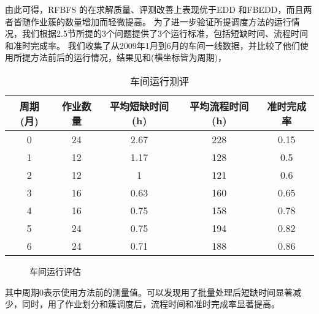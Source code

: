 由此可得，RFBFS 的在求解质量、评测改善上表现优于EDD 和FBEDD，而且两者皆随作业簇的数量增加而轻微提高。
为了进一步验证所提调度方法的运行情况，我们根据2.5节所提的3个问题提供了3个运行标准，包括短缺时间、流程时间和准时完成率。
我们收集了从2009年1月到6月的车间一线数据，并比较了他们使用所提方法前后的运行情况，结果见和(横坐标皆为周期)，
\begin{table}[h]
  \centering\xiaowu
  \caption{车间运行测评\label{tab:performancemeasure}}
    \begin{tabular}{ccccc}
    \toprule
    周期 (月) & 作业数量  & 平均短缺时间 (h) & 平均流程时间 (h) & 准时完成率 \\
    \midrule
    0     & 24    & 2.67  & 228   & 0.15 \\
    1     & 12    & 1.17  & 128   & 0.5 \\
    2     & 12    & 1     & 121   & 0.6 \\
    3     & 16    & 0.63  & 160   & 0.65 \\
    4     & 16    & 0.75  & 158   & 0.78 \\
    5     & 24    & 0.75  & 194   & 0.82 \\
    6     & 24    & 0.71  & 188   & 0.86 \\
    \bottomrule
    \end{tabular}
\end{table}\vspace{-0.8cm}
\begin{figure}[h]
\begin{floatrow}
  \caption{车间运行评估\label{fig:performancemeasures}}
  \end{floatrow}
\end{figure}
其中周期0表示使用方法前的测量值。可以发现用了批量处理后短缺时间显著减少，同时，用了作业划分和簇调度后，流程时间和准时完成率显著提高。
